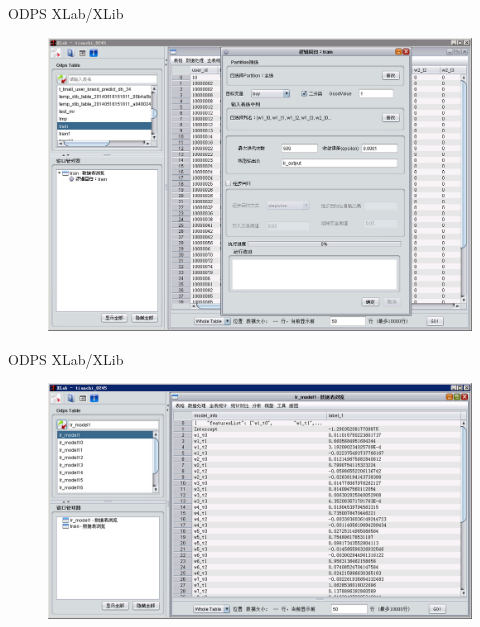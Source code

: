 \documentclass{beamer}
\begin{document}
\begin{frame}{ODPS XLab/XLib}

\begin{figure}
\includegraphics[width=0.9\linewidth]{./XLab_train}
\end{figure}

\end{frame}

\begin{frame}{ODPS XLab/XLib}

\begin{figure}
\includegraphics[width=\linewidth]{./XLab_result}
\end{figure}

\end{frame}
\end{document}
